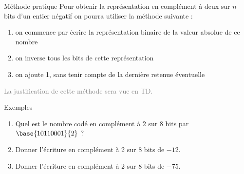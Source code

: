 \documentclass[10pt]{beamer}
\begin{document}
\begin{frame}{\Ctitle}{\stitle}
	\begin{block}{Méthode pratique}
		Pour obtenir la représentation en complément à deux sur $n$ bits d'un entier négatif on pourra utiliser la méthode suivante :
		\begin{enumerate}
			\item<2-> on commence par écrire la représentation binaire de la valeur absolue de ce nombre
			\item<3-> on inverse tous les bits de cette représentation
			\item<4-> on ajoute 1, sans tenir compte de la dernière retenue éventuelle
		\end{enumerate}
	\textcolor{gray}{La justification de cette méthode sera vue en TD.}
	\end{block}
	\begin{exampleblock}{Exemples}
		\begin{enumerate}
			\item<5-> Quel est le nombre codé en complément à 2 sur 8 bits par $\base{10110001}{2}$ ?
			\item<6-> Donner l'écriture en complément à 2 sur 8 bits de $-12$.
			\item<7-> Donner l'écriture en complément à 2 sur 8 bits de $-75$.
		\end{enumerate}
	\end{exampleblock}
\end{frame}
\end{document}
